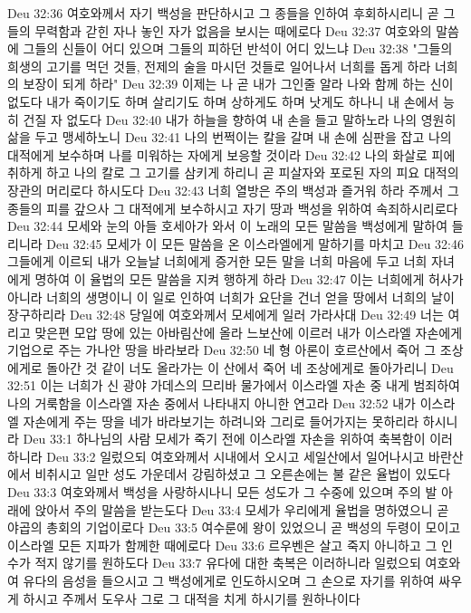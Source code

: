 Deu 32:36  여호와께서 자기 백성을 판단하시고 그 종들을 인하여 후회하시리니 곧 그들의 무력함과 갇힌 자나 놓인 자가 없음을 보시는 때에로다
Deu 32:37  여호와의 말씀에 그들의 신들이 어디 있으며 그들의 피하던 반석이 어디 있느냐
Deu 32:38  "그들의 희생의 고기를 먹던 것들, 전제의 술을 마시던 것들로 일어나서 너희를 돕게 하라 너희의 보장이 되게 하라"
Deu 32:39  이제는 나 곧 내가 그인줄 알라 나와 함께 하는 신이 없도다 내가 죽이기도 하며 살리기도 하며 상하게도 하며 낫게도 하나니 내 손에서 능히 건질 자 없도다
Deu 32:40  내가 하늘을 향하여 내 손을 들고 말하노라 나의 영원히 삶을 두고 맹세하노니
Deu 32:41  나의 번쩍이는 칼을 갈며 내 손에 심판을 잡고 나의 대적에게 보수하며 나를 미워하는 자에게 보응할 것이라
Deu 32:42  나의 화살로 피에 취하게 하고 나의 칼로 그 고기를 삼키게 하리니 곧 피살자와 포로된 자의 피요 대적의 장관의 머리로다 하시도다
Deu 32:43  너희 열방은 주의 백성과 즐거워 하라 주께서 그 종들의 피를 갚으사 그 대적에게 보수하시고 자기 땅과 백성을 위하여 속죄하시리로다
Deu 32:44  모세와 눈의 아들 호세아가 와서 이 노래의 모든 말씀을 백성에게 말하여 들리니라
Deu 32:45  모세가 이 모든 말씀을 온 이스라엘에게 말하기를 마치고
Deu 32:46  그들에게 이르되 내가 오늘날 너희에게 증거한 모든 말을 너희 마음에 두고 너희 자녀에게 명하여 이 율법의 모든 말씀을 지켜 행하게 하라
Deu 32:47  이는 너희에게 허사가 아니라 너희의 생명이니 이 일로 인하여 너희가 요단을 건너 얻을 땅에서 너희의 날이 장구하리라
Deu 32:48  당일에 여호와께서 모세에게 일러 가라사대
Deu 32:49  너는 여리고 맞은편 모압 땅에 있는 아바림산에 올라 느보산에 이르러 내가 이스라엘 자손에게 기업으로 주는 가나안 땅을 바라보라
Deu 32:50  네 형 아론이 호르산에서 죽어 그 조상에게로 돌아간 것 같이 너도 올라가는 이 산에서 죽어 네 조상에게로 돌아가리니
Deu 32:51  이는 너희가 신 광야 가데스의 므리바 물가에서 이스라엘 자손 중 내게 범죄하여 나의 거룩함을 이스라엘 자손 중에서 나타내지 아니한 연고라
Deu 32:52  내가 이스라엘 자손에게 주는 땅을 네가 바라보기는 하려니와 그리로 들어가지는 못하리라 하시니라
Deu 33:1  하나님의 사람 모세가 죽기 전에 이스라엘 자손을 위하여 축복함이 이러하니라
Deu 33:2  일렀으되 여호와께서 시내에서 오시고 세일산에서 일어나시고 바란산에서 비취시고 일만 성도 가운데서 강림하셨고 그 오른손에는 불 같은 율법이 있도다
Deu 33:3  여호와께서 백성을 사랑하시나니 모든 성도가 그 수중에 있으며 주의 발 아래에 앉아서 주의 말씀을 받는도다
Deu 33:4  모세가 우리에게 율법을 명하였으니 곧 야곱의 총회의 기업이로다
Deu 33:5  여수룬에 왕이 있었으니 곧 백성의 두령이 모이고 이스라엘 모든 지파가 함께한 때에로다
Deu 33:6  르우벤은 살고 죽지 아니하고 그 인수가 적지 않기를 원하도다
Deu 33:7  유다에 대한 축복은 이러하니라 일렀으되 여호와여 유다의 음성을 들으시고 그 백성에게로 인도하시오며 그 손으로 자기를 위하여 싸우게 하시고 주께서 도우사 그로 그 대적을 치게 하시기를 원하나이다
